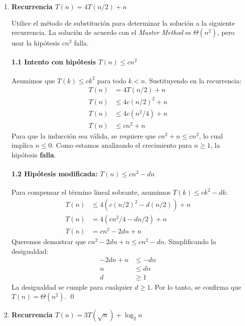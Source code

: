 \documentclass{article}
\begin{document}
\begin{enumerate}
    \item \textbf{Recurrencia $T(n) = 4T(n/2) + n$}
    
    Utilice el método de substitución para determinar la solución a la siguiente recurrencia. La solución de acuerdo con el \textit{Master Method} es $\Theta(n^2)$, pero usar la hipótesis $cn^2$ falla.
    
    \paragraph{1.1 Intento con hipótesis $T(n) \le cn^2$}
    Asumimos que $T(k) \le ck^2$ para todo $k < n$. Sustituyendo en la recurrencia:
    \begin{align*}
        T(n) &= 4T(n/2) + n \\
        T(n) &\le 4c(n/2)^2 + n \\
        T(n) &\le 4c(n^2/4) + n \\
        T(n) &\le cn^2 + n
    \end{align*}
    Para que la inducción sea válida, se requiere que $cn^2 + n \le cn^2$, lo cual implica $n \le 0$. Como estamos analizando el crecimiento para $n \ge 1$, la hipótesis \textbf{falla}.

    \paragraph{1.2 Hipótesis modificada: $T(n) \le cn^2 - dn$}
    Para compensar el término lineal sobrante, asumimos $T(k) \le ck^2 - dk$:
    \begin{align*}
        T(n) &\le 4(c(n/2)^2 - d(n/2)) + n \\
        T(n) &= 4(cn^2/4 - dn/2) + n \\
        T(n) &= cn^2 - 2dn + n
    \end{align*}
    Queremos demostrar que $cn^2 - 2dn + n \le cn^2 - dn$. Simplificando la desigualdad:
    \begin{align*}
        -2dn + n &\le -dn \\
        n &\le dn \\
        d &\ge 1
    \end{align*}
    La desigualdad se cumple para cualquier $d \ge 1$. Por lo tanto, se confirma que $T(n) = \Theta(n^2)$. \qed

    \vspace{2em}

    \item \textbf{Recurrencia $T(n) = 3T(\sqrt{n}) + \log_2 n$}
    

\end{enumerate}
\end{document}
